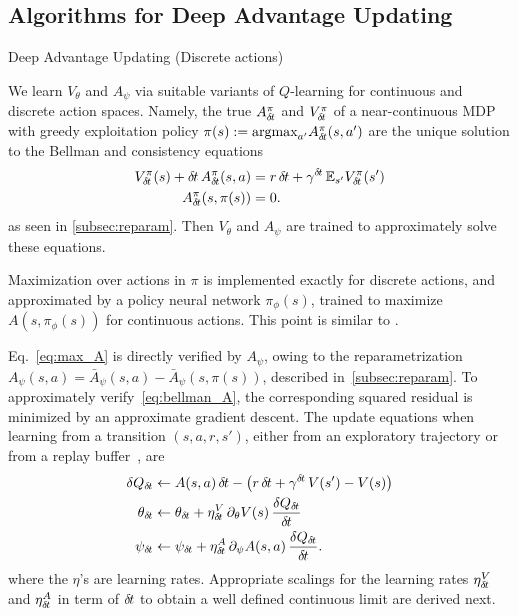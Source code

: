 \subsection{Algorithms for Deep Advantage Updating}
\label{subsec:algorithm}
\begin{algorithm}[ht]
  \caption{Deep Advantage Updating (Discrete actions)}
  \label{alg:dau}
	
\end{algorithm}

We learn $V_{\theta}$ and $A_{\psi}$ via suitable variants of $Q$-learning for continuous and
discrete action spaces. Namely, 
the true $A^\pi_{\delta\hspace{-.1em}t}$
and $V^\pi_{\delta\hspace{-.1em}t}$ of a near-continuous MDP with greedy exploitation
policy $\pi(s) \mathrel{\mathop{:}}=
\text{argmax}_{a'}A^\pi_{\delta\hspace{-.1em}t}(s, a')$
are the unique solution to the Bellman and consistency equations
\begin{align}
	V^{\pi}_{\delta\hspace{-.1em}t}(s) + {\delta\hspace{-.1em}t}\, A^{\pi}_{\delta\hspace{-.1em}t}(s, a) &=
	r\,{\delta\hspace{-.1em}t} + \gamma^{{\delta\hspace{-.1em}t}}  \,\mathbb{E}_{s'} V^{\pi}_{\delta\hspace{-.1em}t}(s')\label{eq:bellman_A}\\
	A^{\pi}_{\delta\hspace{-.1em}t}(s, \pi(s)) &= 0\label{eq:max_A}.
\end{align}
as seen in \ref{subsec:reparam}. Then $V_{\theta}$
and $A_{\psi}$ are trained to approximately solve these equations.

Maximization over actions in $\pi$ is implemented exactly for discrete actions,
and approximated by a policy neural network $\pi_\phi(s)$, trained to maximize $A(s,
\pi_\phi(s))$ for continuous actions. This point is similar to
\cite{ddpg}.

Eq.~\eqref{eq:max_A}
is directly verified by $A_{\psi}$, owing to the reparametrization
$A_\psi(s, a) = \bar{A}_\psi(s, a) - \bar{A}_\psi(s, \pi(s))$, described
in~\ref{subsec:reparam}.  To approximately verify~\eqref{eq:bellman_A}, the
corresponding squared residual is minimized by an approximate gradient descent.
The update equations when learning from a transition $(s, a, r, s')$, either from
an exploratory trajectory or from a replay buffer~\cite{dqn}, are
\begin{align}
	\delta Q_{\delta\hspace{-.1em}t} &\leftarrow A(s, a)\, {\delta\hspace{-.1em}t} - \left(r
	\,{\delta\hspace{-.1em}t} + \gamma^{{\delta\hspace{-.1em}t}}\, V(s') - V(s)\right)\\
	\label{eq:approx_deltaQ}
	\theta_{\delta\hspace{-.1em}t} &\leftarrow \theta_{\delta\hspace{-.1em}t} + \eta^V_{\delta\hspace{-.1em}t}
	\,\partial_{\theta} V(s) \,\frac{\delta Q_{\delta\hspace{-.1em}t}}{{\delta\hspace{-.1em}t}}\\
	\psi_{\delta\hspace{-.1em}t} &\leftarrow \psi_{\delta\hspace{-.1em}t} + \eta^A_{\delta\hspace{-.1em}t}
	\,\partial_{\psi} A(s, a) \,\frac{\delta Q_{\delta\hspace{-.1em}t}}{{\delta\hspace{-.1em}t}}.
	\label{eq:approx_bellman_A}
\end{align} 
where the $\eta$'s are learning rates.
Appropriate scalings for the learning rates $\eta^V_{\delta\hspace{-.1em}t}$ and
$\eta^A_{\delta\hspace{-.1em}t}$ in term of ${\delta\hspace{-.1em}t}$ to obtain a well defined continuous
limit are derived next.

